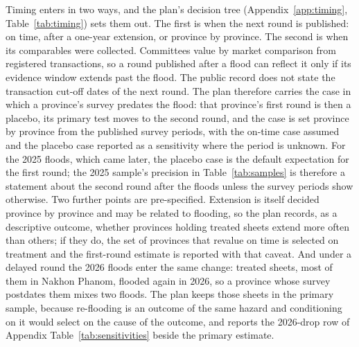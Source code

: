 Timing enters in two ways, and the plan's decision tree (Appendix~\ref{app:timing}, Table~\ref{tab:timing}) sets them out. The first is when the next round is published: on time, after a one-year extension, or province by province. The second is when its comparables were collected. Committees value by market comparison from registered transactions, so a round published after a flood can reflect it only if its evidence window extends past the flood. The public record does not state the transaction cut-off dates of the next round. The plan therefore carries the case in which a province's survey predates the flood: that province's first round is then a placebo, its primary test moves to the second round, and the case is set province by province from the published survey periods, with the on-time case assumed and the placebo case reported as a sensitivity where the period is unknown. For the 2025 floods, which came later, the placebo case is the default expectation for the first round; the 2025 sample's precision in Table~\ref{tab:samples} is therefore a statement about the second round after the floods unless the survey periods show otherwise. Two further points are pre-specified. Extension is itself decided province by province and may be related to flooding, so the plan records, as a descriptive outcome, whether provinces holding treated sheets extend more often than others; if they do, the set of provinces that revalue on time is selected on treatment and the first-round estimate is reported with that caveat. And under a delayed round the 2026 floods enter the same change: \sensRefloodDropped{} treated sheets, most of them in Nakhon Phanom, flooded again in 2026, so a province whose survey postdates them mixes two floods. The plan keeps those sheets in the primary sample, because re-flooding is an outcome of the same hazard and conditioning on it would select on the cause of the outcome, and reports the 2026-drop row of Appendix Table~\ref{tab:sensitivities} beside the primary estimate.

